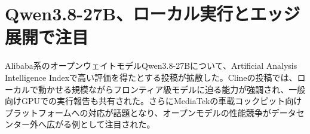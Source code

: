 \section{Qwen3.8-27B、ローカル実行とエッジ展開で注目}
Alibaba系のオープンウェイトモデルQwen3.8-27Bについて、Artificial Analysis Intelligence Indexで高い評価を得たとする投稿が拡散した。Clineの投稿では、ローカルで動かせる規模ながらフロンティア級モデルに迫る能力が強調され、一般向けGPUでの実行報告も共有された。さらにMediaTekの車載コックピット向けプラットフォームへの対応が話題となり、オープンモデルの性能競争がデータセンター外へ広がる例として注目された。
